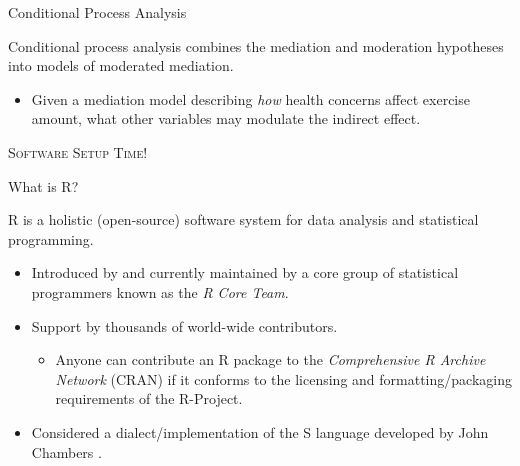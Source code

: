 \documentclass{beamer}
\newcommand{\va}[0]{\vspace{12pt}}
\newcommand{\vb}[0]{\vspace{6pt}}
\newcommand{\vc}[0]{\vspace{3pt}}
\newcommand{\lang}[1]{\textsf{#1}}
\begin{document}
\begin{frame}{Conditional Process Analysis}
  
  Conditional process analysis combines the mediation and moderation
  hypotheses into models of moderated mediation.
  \va
  \begin{itemize}
    \item Given a mediation model describing \emph{how} health
      concerns affect exercise amount, what other variables may
      modulate the indirect effect.
  \end{itemize}
  
\end{frame}

\begin{frame}{}
  
  \begin{center}\huge{\textsc{Software Setup Time!}} \end{center}
  
\end{frame}


\begin{frame}{What is \lang{R}?}
  
  \lang{R} is a holistic (open-source) software system for data
  analysis and statistical programming.  
  \vb
  \begin{itemize}
  \item Introduced by \citet{ihakaGentleman:1996} and currently
    maintained by a core group of statistical programmers known as
    the \emph{R Core Team}.
    \vb
  \item Support by thousands of world-wide contributors.  \vc
    \begin{itemize}
      \item Anyone can contribute an R package to the
        \emph{Comprehensive R Archive Network} (CRAN) if it conforms
        to the licensing and formatting/packaging requirements of the
        R-Project.
    \end{itemize}
    \vb
  \item Considered a dialect/implementation of the \lang{S} language
    developed by John Chambers \citep{beckerChambers:1984,
      beckerEtAl:1988, chambersHastie:1992, chambers:1998}.
  \end{itemize}
  
\end{frame}
\end{document}
